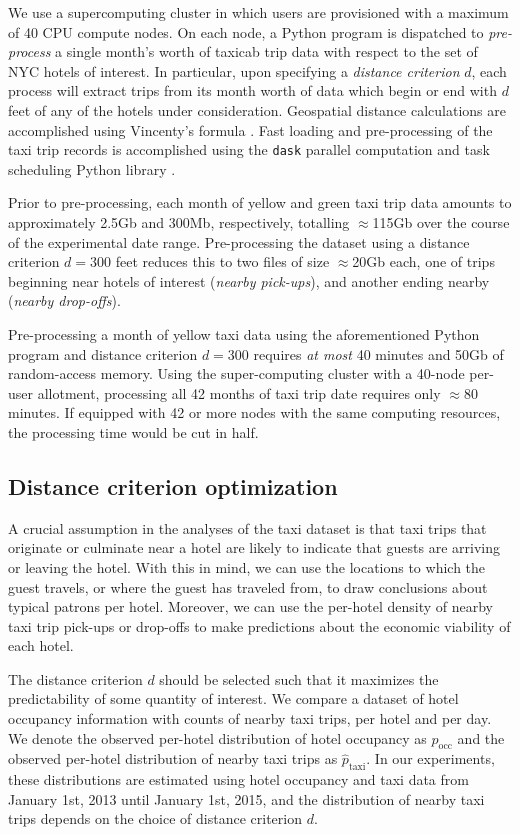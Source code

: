 \documentclass[useAMS, usenatbib]{biom}
\begin{document}
We use a supercomputing cluster in which users are provisioned with a maximum of 40 CPU compute nodes. On each node, a Python program is dispatched to \textit{pre-process} a single month's worth of taxicab trip data with respect to the set of NYC hotels of interest. In particular, upon specifying a \textit{distance criterion} $d$, each process will extract trips from its month worth of data which begin or end with $d$ feet of any of the hotels under consideration. Geospatial distance calculations are accomplished using Vincenty's formula \citep{bessel_calculation_2010}. Fast loading and pre-processing of the taxi trip records is accomplished using the \texttt{dask} parallel computation and task scheduling Python library \cite{dask}.

Prior to pre-processing, each month of yellow and green taxi trip data amounts to approximately 2.5Gb and 300Mb, respectively, totalling $\approx$115Gb over the course of the experimental date range. Pre-processing the dataset using a distance criterion $d = 300$ feet reduces this to two files of size $\approx$20Gb each, one of trips beginning near hotels of interest (\textit{nearby pick-ups}), and another ending nearby (\textit{nearby drop-offs}).

Pre-processing a month of yellow taxi data using the aforementioned Python program and distance criterion $d = 300$ requires \textit{at most} 40 minutes and 50Gb of random-access memory. Using the super-computing cluster with a 40-node per-user allotment, processing all 42 months of taxi trip date requires only $\approx$80 minutes. If equipped with 42 or more nodes with the same computing resources, the processing time would be cut in half.

\subsection{Distance criterion optimization}

A crucial assumption in the analyses of the taxi dataset is that taxi trips that originate or culminate near a hotel are likely to indicate that guests are arriving or leaving the hotel. With this in mind, we can use the locations to which the guest travels, or where the guest has traveled from, to draw conclusions about typical patrons per hotel. Moreover, we can use the per-hotel density of nearby taxi trip pick-ups or drop-offs to make predictions about the economic viability of each hotel.

The distance criterion $d$ should be selected such that it maximizes the predictability of some quantity of interest. We compare a dataset of hotel occupancy information with counts of nearby taxi trips, per hotel and per day. We denote the observed per-hotel distribution of hotel occupancy as $\hat{p}_{\mathrm{occ}}$ and the observed per-hotel distribution of nearby taxi trips as $\hat{p}_{\mathrm{taxi}}$. In our experiments, these distributions are estimated using hotel occupancy and taxi data from January 1st, 2013 until January 1st, 2015, and the distribution of nearby taxi trips depends on the choice of distance criterion $d$.
\end{document}
